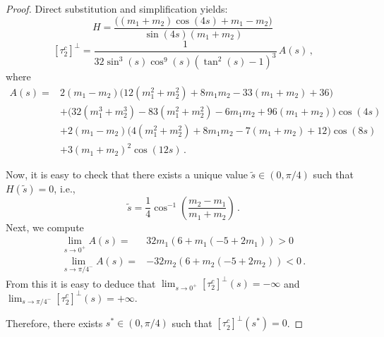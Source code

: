 \documentclass[10pt,a4paper]{amsart}
\begin{document}
\begin{proof}
Direct substitution and simplification yields:
\[
H=\frac{ \Big((m_1+m_2) \cos (4s)+m_1-m_2 \Big)}{\sin(4s) (m_1+m_2)}\,
\]
\[
[\tau_2^c]^\perp=\frac{1}{32 \sin^3(s) \cos^9(s)\left(\tan ^2(s)-1\right)^3} \,A(s)\,,
\]
where
\begin{equation}\label{eq:polyAs}
\begin{aligned}
A(s)=&2 (m_1 - m_2) \big(12 (m_1^2 + m_2^2) + 8 m_1 m_2 - 33 ( m_1 + m_2) + 36\big)\\
   &+ \big(32 (m_1^3 + m_2^3) - 83 (m_1^2 + m_2^2) - 6 m_1 m_2 + 96 (m_1 + m_2)\big)\cos (4 s)\\
   &+2 (m_1 - m_2) \big(4 (m_1^2 + m_2^2) + 8 m_1 m_2 - 7 (m_1 + m_2) + 12\big) \cos (8 s)\\
   &+3 (m_1 + m_2)^2 \cos (12 s)\,.
\end{aligned}
\end{equation}

Now, it is easy to check that there exists a unique value $\tilde{s}\in (0,\pi/4)$ such that $H(\tilde{s})=0$, i.e.,
\[
\tilde{s}= \frac{1}{4} \cos
   ^{-1}\left(\frac{m_2-m_1}{m_1+m_2}\right)\,.
\]
Next, we compute
\begin{equation}\label{eq:limiti}
\begin{aligned}
\lim_{s\to 0^+} A(s) =& 32 m_1 (6 + m_1 (-5 + 2 m_1))>0\\
\lim_{s\to \pi/4^-} A (s)  =&-32 m_2 (6 + m_2 (-5 + 2 m_2))<0\,.
\end{aligned}
\end{equation}
From this it is easy to deduce that $\lim_{s \to 0^+}[\tau_2^c]^\perp(s)=-\infty$ and $\lim_{s \to \pi/4 ^-}[\tau_2^c]^\perp(s)=+\infty$. 

Therefore, there exists $s^*\in (0,\pi/4)$ such that $[\tau_2^c]^\perp(s^*)=0$. 


\end{proof}
\end{document}
